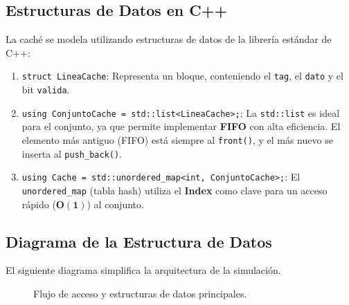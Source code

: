 \documentclass[12pt, a4paper]{article}
\begin{document}
\subsection{Estructuras de Datos en C++}
\label{sec:estructuras}
La caché se modela utilizando estructuras de datos de la librería estándar de C++:
\begin{enumerate}
    \item \texttt{struct LineaCache}: Representa un bloque, conteniendo el \texttt{tag}, el \texttt{dato} y el bit \texttt{valida}.
    \item \texttt{using ConjuntoCache = std::list<LineaCache>;}: La \texttt{std::list} es ideal para el conjunto, ya que permite implementar \textbf{FIFO} con alta eficiencia. El elemento más antiguo (FIFO) está siempre al \texttt{front()}, y el más nuevo se inserta al \texttt{push\_back()}.
    \item \texttt{using Cache = std::unordered\_map<int, ConjuntoCache>;}: El \texttt{unordered\_map} (tabla hash) utiliza el \textbf{Index} como clave para un acceso rápido ($\mathbf{O(1)}$) al conjunto.
\end{enumerate}

\subsection{Diagrama de la Estructura de Datos}
El siguiente diagrama simplifica la arquitectura de la simulación.
\begin{figure}[h]
    \centering
    \caption{Flujo de acceso y estructuras de datos principales.}
\end{figure}
\end{document}
